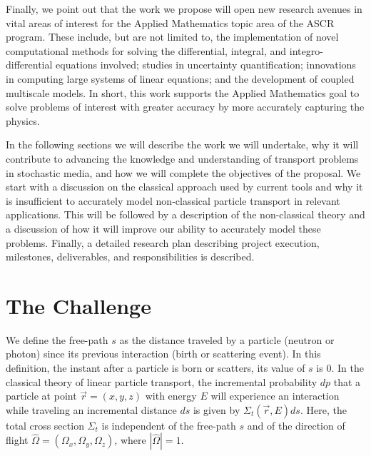 \documentclass[12pt]{article}
\newcommand{\rvec}{\ensuremath{\vec{r}}}
\newcommand{\omvec}{\ensuremath{\hat{\Omega}}}
\begin{document}
Finally, we point out that the work we propose will open new research avenues in vital areas of interest for the Applied Mathematics topic area of the ASCR program.
These include, but are not limited to, the implementation of novel computational methods for solving the differential, integral, and integro-differential equations involved; studies in uncertainty quantification; innovations in computing large systems of linear equations; and the development of coupled multiscale models.
In short, this work supports the Applied Mathematics goal to solve problems of interest with greater accuracy by more accurately capturing the physics.

In the following sections we will describe the work we will undertake, why it will contribute to advancing the knowledge and understanding of transport problems in stochastic media, and how we will complete the objectives of the proposal.
We start with a discussion on the classical approach used by current tools and why it is insufficient to accurately model non-classical particle transport in relevant applications.
This will be followed by a description of the non-classical theory and a discussion of
how it will improve our ability to accurately model these problems.
Finally, a detailed research plan describing project execution, milestones, deliverables, and responsibilities is described.

\section{The Challenge}

We define the free-path $s$ as the distance traveled by a particle (neutron or photon) since its previous interaction (birth or scattering event).
In this definition, the instant after a particle is born or scatters, its value of $s$ is 0.
In the classical theory of linear particle transport, the incremental probability $dp$ that a particle at point $\rvec = (x,y,z)$ with energy $E$ will experience an interaction while traveling an incremental distance $ds$ is given by $\Sigma_t(\rvec,E)ds$.
Here, the total cross section $\Sigma_t$ is independent of the free-path $s$ and of the direction of flight $\omvec = (\Omega_x,\Omega_y,\Omega_z)$, where $|\omvec|=1$.
\end{document}

